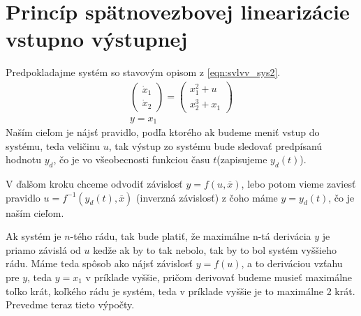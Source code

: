     \section{Princíp spätnovezbovej linearizácie \\ vstupno výstupnej}
    Predpokladajme systém so stavovým opisom z \cref{eqn:svlvv_sys2}.
    \begin{equation}
        \begin{gathered}
        \begin{pmatrix} 
            \dot{x}_1 \\ 
            \dot{x}_2
        \end{pmatrix} = \begin{pmatrix}
            x_1^2 + u \\
            x_2^3 + x_1
        \end{pmatrix}\\
            y = x_1
        \end{gathered}
        \label{eqn:svlvv_sys2}
    \end{equation}
    Naším cieľom je nájsť pravidlo, podľa ktorého ak budeme meniť vstup do systému, teda veličinu $u$, tak výstup zo systému bude sledovať predpísanú hodnotu $y_d$, čo je vo všeobecnosti funkciou času $t$(zapisujeme $y_d(t)$).

    V ďalšom kroku chceme odvodiť závislosť $y = f(u, \overbar{x})$, lebo potom vieme zaviesť pravidlo $u = f^{-1}(y_d(t), \overbar{x})$ (inverzná závislosť) z čoho máme $y = y_d(t)$, čo je naším cieľom.

    Ak systém je $n$-tého rádu, tak bude platiť, že maximálne n-tá derivácia $y$ je priamo závislá od $u$ kedže ak by to tak nebolo, tak by to bol systém vyššieho rádu. Máme teda spôsob ako nájsť závislosť $ y = f(u) $, a to deriváciou vzťahu pre $y$, teda $y = x_1$ v príklade vyššie, pričom derivovať budeme musieť maximálne toľko krát, koľkého rádu je systém, teda v príklade vyššie je to maximálne 2 krát. Prevedme teraz tieto výpočty.



